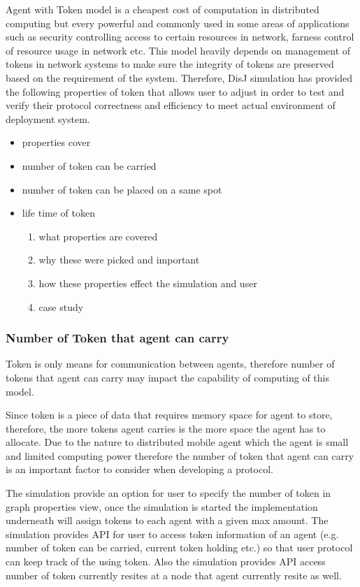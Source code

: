 Agent with Token model is a cheapest cost of computation in distributed computing but every powerful and commonly used in some areas of applications such as security controlling access to certain resources in network, farness control of resource usage in network etc. This model heavily depends on management of tokens in network systems to make sure the integrity of tokens are preserved based on the requirement of the system. Therefore, DisJ simulation has provided the following properties of token that allows user to adjust in order to test and verify their protocol correctness and efficiency to meet actual environment of deployment system.

\begin{itemize}
\item properties cover
\item number of token can be carried
\item number of token can be placed on a same spot
\item life time of token
    \begin{enumerate}
    \item what properties are covered
    \item why these were picked and important
    \item how these properties effect the simulation and user
    \item case study
    \end{enumerate}
\end{itemize}


\subsubsection*{Number of Token that agent can carry}
Token is only means for communication between agents, therefore number of tokens that agent can carry may impact the capability of computing of this model.

Since token is a piece of data that requires memory space for agent to store, therefore, the more tokens agent carries is the more space the agent has to allocate. Due to the nature to distributed mobile agent which the agent is small and limited computing power therefore the number of token that agent can carry is an important factor to consider when developing a protocol.

The simulation provide an option for user to specify the number of token in graph properties view, once the simulation is started the implementation underneath will assign tokens to each agent with a given max amount. The simulation provides API for user to access token information of an agent (e.g. number of token can be carried, current token holding etc.) so that user protocol can keep track of the using token. Also the simulation provides API access number of token currently resites at a node that agent currently resite as well.

